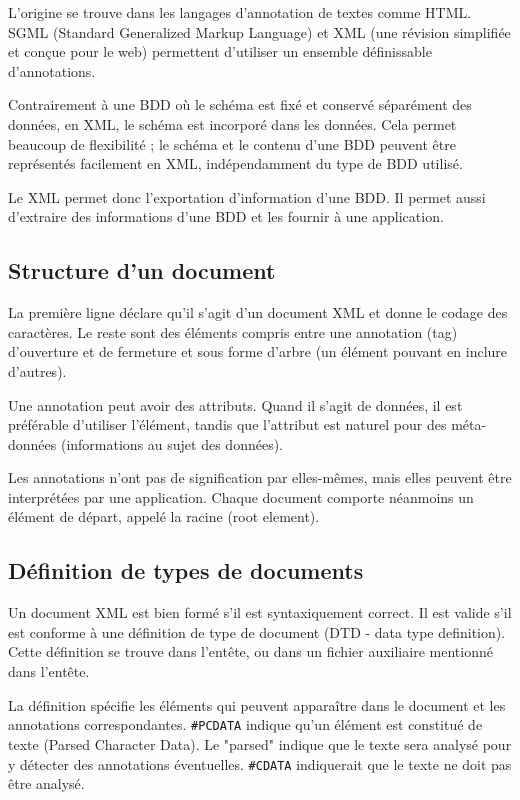 	L'origine se trouve dans les langages d'annotation de textes comme HTML. SGML (Standard Generalized Markup Language) et XML (une révision simplifiée et conçue pour le web) permettent d'utiliser un ensemble définissable d'annotations.
	
	Contrairement à une BDD où le schéma est fixé et conservé séparément des données, en XML, le schéma est incorporé dans les données. Cela permet beaucoup de flexibilité ; le schéma et le contenu d'une BDD peuvent être représentés facilement en XML, indépendamment du type de BDD utilisé.
	
	Le XML permet donc l'exportation d'information d'une BDD. Il permet aussi d'extraire des informations d'une BDD et les fournir à une application.
	
		\subsection{Structure d'un document}
		
		
		La première ligne déclare qu'il s'agit d'un document XML et donne le codage des caractères. Le reste sont des éléments compris entre une annotation (tag) d'ouverture et de fermeture et sous forme d'arbre (un élément pouvant en inclure d'autres).
		
		Une annotation peut avoir des attributs. Quand il s'agit de données, il est préférable d'utiliser l'élément, tandis que l'attribut est naturel pour des méta-données (informations au sujet des données).
		
		Les annotations n'ont pas de signification par elles-mêmes, mais elles peuvent être interprétées par une application. Chaque document comporte néanmoins un élément de départ, appelé la racine (root element).
		
		\subsection{Définition de types de documents}

		Un document XML est bien formé s'il est syntaxiquement correct. Il est valide s'il est conforme à une définition de type de document (DTD - data type definition).  Cette définition se trouve dans l'entête, ou dans un fichier auxiliaire mentionné dans l'entête.
		
		
		La définition spécifie les éléments qui peuvent apparaître dans le document et les annotations correspondantes. \texttt{\#PCDATA} indique qu'un élément est constitué de texte (Parsed Character Data). Le "parsed" indique que le texte sera analysé pour y détecter des annotations éventuelles. \texttt{\#CDATA} indiquerait que le texte ne doit pas être analysé.
		
